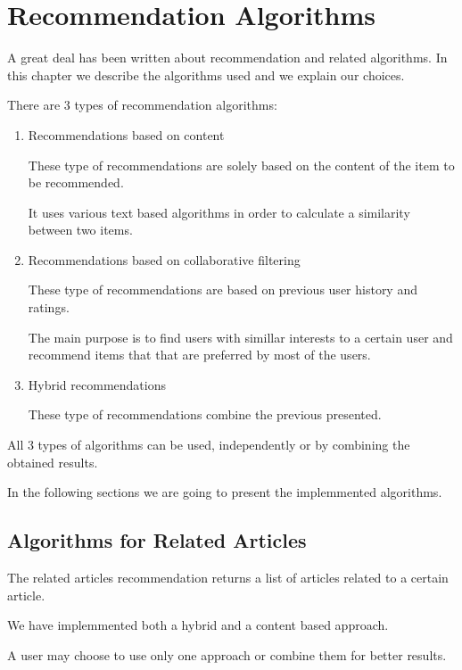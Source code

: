 \chapter{Recommendation Algorithms}
\label{chapter:recommendation-system-algorithms}
A great deal has been written about recommendation and related algorithms. In this chapter we describe the algorithms used and we explain our choices.

There are 3 types of recommendation algorithms: 
\begin{enumerate}
	\item Recommendations based on content
		 
		These type of recommendations are solely based on the content of the item to be recommended.
		
		It uses various text based algorithms in order to calculate a similarity between two items.

	\item Recommendations based on collaborative filtering 
		
		These type of recommendations are based on previous user history and ratings.
		 
		The main purpose is to find users with simillar interests to a certain user and recommend items that that are preferred by most of the users.
	
	\item Hybrid recommendations

		These type of recommendations combine the previous presented.

\end{enumerate}
All 3 types of algorithms can be used, independently or by combining the obtained results.

In the following sections we are going to present the implemmented algorithms.


\section{Algorithms for Related Articles}
\label{sec:algorithms-for-related-articles}
The related articles recommendation returns a list of articles related to a certain article.

We have implemmented both a hybrid and a content based approach.

A user may choose to use only one approach or combine them for better results.

